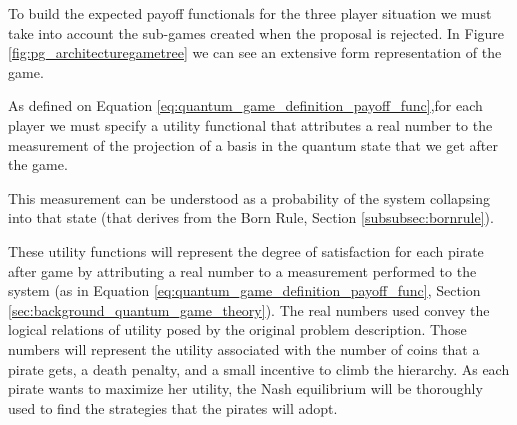 To build the expected payoff functionals for the three player situation we must take into account the sub-games created when the proposal is rejected. In Figure \ref{fig:pg_architecturegametree} we can see an extensive form representation of the game.

As defined on Equation \ref{eq:quantum_game_definition_payoff_func},for each player we must specify a utility functional that attributes a real number to the measurement of the projection of a basis in the quantum state that we get after the game. 


This measurement can be understood as a probability of the system collapsing into that state (that derives from the Born Rule, Section \ref{subsubsec:bornrule}).


These utility functions will represent the degree of satisfaction for each pirate after game by attributing a real number to a measurement performed to the system (as in Equation \ref{eq:quantum_game_definition_payoff_func}, Section \ref{sec:background_quantum_game_theory}). 
The real numbers used convey the logical relations of utility posed by the original problem description. Those numbers will represent the utility associated with the number of coins that a pirate gets, a death penalty, and a small incentive to climb the hierarchy. As each pirate wants to maximize her utility, the Nash equilibrium will be thoroughly used to find the strategies that the pirates will adopt\cite{nash50}\cite{Nash51}.




